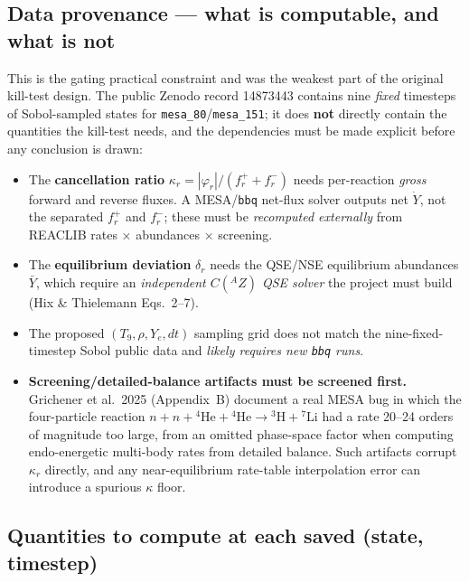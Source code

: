\documentclass[11pt]{article}
\newcommand{\nuc}[2]{\ensuremath{{}^{#2}\mathrm{#1}}}
\begin{document}
\subsection{Data provenance --- what is computable, and what is not}

This is the gating practical constraint and was the weakest part of the original kill-test design. The public Zenodo record 14873443 contains nine \emph{fixed} timesteps of Sobol-sampled states for \texttt{mesa\_80}/\texttt{mesa\_151}; it does \textbf{not} directly contain the quantities the kill-test needs, and the dependencies must be made explicit before any conclusion is drawn:
\begin{itemize}
\item The \textbf{cancellation ratio} $\kappa_r = |\varphi_r|/(f_r^+ + f_r^-)$ needs per-reaction \emph{gross} forward and reverse fluxes. A MESA/\texttt{bbq} net-flux solver outputs net $\dot{Y}$, not the separated $f_r^+$ and $f_r^-$; these must be \emph{recomputed externally} from REACLIB rates $\times$ abundances $\times$ screening.
\item The \textbf{equilibrium deviation} $\delta_r$ needs the QSE/NSE equilibrium abundances $\bar{Y}$, which require an \emph{independent $C({}^{A}Z)$ QSE solver} the project must build (Hix \& Thielemann Eqs.\ 2--7).
\item The proposed $(T_9, \rho, Y_e, dt)$ sampling grid does not match the nine-fixed-timestep Sobol public data and \emph{likely requires new \texttt{bbq} runs}.
\item \textbf{Screening/detailed-balance artifacts must be screened first.} Grichener et al.\ 2025 (Appendix~B) document a real MESA bug in which the four-particle reaction $n + n + \nuc{He}{4} + \nuc{He}{4} \to \nuc{H}{3} + \nuc{Li}{7}$ had a rate 20--24 orders of magnitude too large, from an omitted phase-space factor when computing endo-energetic multi-body rates from detailed balance. Such artifacts corrupt $\kappa_r$ directly, and any near-equilibrium rate-table interpolation error can introduce a spurious $\kappa$ floor.
\end{itemize}

\subsection{Quantities to compute at each saved (state, timestep)}
\end{document}
